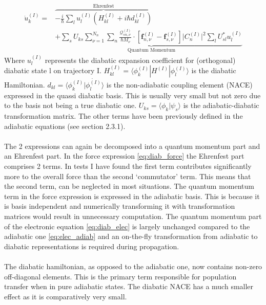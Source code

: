\begin{align}
\dot{u}_k^{(I)} =
&\overbrace{ - \frac{i}{\hbar}\sum\limits_{l} u_l^{(I)} \left(H_{kl}^{(I)} + i \hbar d_{kl}^{(I)} \right) }^{\text{Ehrenfest}} \\
& + \underbrace{\sum_{s} U_{ks} \sum_{\nu = 1}^{N_n} \sum_n   \frac{\mathcal{Q}_{sn,\nu}^{(I)}}{\hbar M_\nu}\cdot \left[ \mathbf{f}_{n, \nu}^{(I)}- \mathbf{f}^{(I)}_{s, \nu}\right]\vert C_n^{(I)} \vert^2 \sum_{l} U^{*}_{sl} u^{(I)}_{l}}_{\text{Quantum Momentum}}
\label{eq:diab_elec}
\end{align}
Where $u_l^{(I)}$ represents the diabatic expansion coefficient for (orthogonal) diabatic state l on trajectory I. $H_{kl}^{(I)} = \langle \phi_{k}^{(I)} | H^{(I)} | \phi_{l}^{(I)} \rangle$ is the diabatic Hamiltonian. $d_{kl} = \langle \phi_{k}^{(I)} | \dot{\phi_{l}^{(I)}} \rangle$ is the non-adiabatic coupling element (NACE) expressed in the quassi diabatic basis. This is usually very small but not zero due to the basis not being a true diabatic one. $U_{ks} = \langle \phi_{k} | \psi_{s} \rangle $
is the adiabatic-diabatic transformation matrix. The other terms have been previously defined in the adiabatic equations (see section
 2.3.1).
 \\\\
 The 2 expressions can again be decomposed into a quantum momentum part and an Ehrenfest part. In the force expression \eqref{eq:diab_force} the Ehrenfest part comprises 2 terms. In tests I have found the first term  contributes significantly more to the overall force than the second `commutator' term. This means that the second term, can be neglected in most situations. The quantum momentum term in the force expression is expressed in the adiabatic basis. This is because it is basis independent and numerically transforming it with transformation matrices would result in unnecessary computation. The quantum momentum part of the electronic equation \eqref{eq:diab_elec} is largely unchanged compared to the adiabatic one \eqref{eq:elec_adiab} and an on-the-fly transformation from adiabatic to diabatic representations is required during propagation.
 \\\\
 The diabatic hamiltonian, as opposed to the adiabatic one, now contains non-zero off-diagonal elements. This is the primary term responsible for population transfer when in pure adiabatic states. The diabatic NACE has a much smaller effect as it is comparatively very small.
